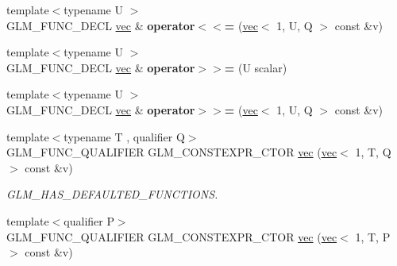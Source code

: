 \begin{DoxyCompactItemize}
{\footnotesize template$<$typename U $>$ }\\G\+L\+M\+\_\+\+F\+U\+N\+C\+\_\+\+D\+E\+CL \hyperlink{structglm_1_1vec}{vec} \& {\bfseries operator$<$$<$=} (\hyperlink{structglm_1_1vec}{vec}$<$ 1, U, Q $>$ const \&v)
\item 
\mbox{\label{structglm_1_1vec_3_011_00_01T_00_01Q_01_4_ad2dbafc1f534fa390f9d50a910c20abb}} 
{\footnotesize template$<$typename U $>$ }\\G\+L\+M\+\_\+\+F\+U\+N\+C\+\_\+\+D\+E\+CL \hyperlink{structglm_1_1vec}{vec} \& {\bfseries operator$>$$>$=} (U scalar)
\item 
\mbox{\label{structglm_1_1vec_3_011_00_01T_00_01Q_01_4_a0b53de5663c96aec88f8ae0ab35ff4cd}} 
{\footnotesize template$<$typename U $>$ }\\G\+L\+M\+\_\+\+F\+U\+N\+C\+\_\+\+D\+E\+CL \hyperlink{structglm_1_1vec}{vec} \& {\bfseries operator$>$$>$=} (\hyperlink{structglm_1_1vec}{vec}$<$ 1, U, Q $>$ const \&v)
\item 
\mbox{\label{structglm_1_1vec_3_011_00_01T_00_01Q_01_4_acf2830b0c38c9707dcda85083f1c93ba}} 
{\footnotesize template$<$typename T , qualifier Q$>$ }\\G\+L\+M\+\_\+\+F\+U\+N\+C\+\_\+\+Q\+U\+A\+L\+I\+F\+I\+ER G\+L\+M\+\_\+\+C\+O\+N\+S\+T\+E\+X\+P\+R\+\_\+\+C\+T\+OR \hyperlink{structglm_1_1vec_3_011_00_01T_00_01Q_01_4_acf2830b0c38c9707dcda85083f1c93ba}{vec} (\hyperlink{structglm_1_1vec}{vec}$<$ 1, T, Q $>$ const \&v)
\begin{DoxyCompactList}\small\item\em G\+L\+M\+\_\+\+H\+A\+S\+\_\+\+D\+E\+F\+A\+U\+L\+T\+E\+D\+\_\+\+F\+U\+N\+C\+T\+I\+O\+NS. \end{DoxyCompactList}\item 
\mbox{\label{structglm_1_1vec_3_011_00_01T_00_01Q_01_4_a65d7b47aa379986d75f0e64f7141f5d0}} 
{\footnotesize template$<$qualifier P$>$ }\\G\+L\+M\+\_\+\+F\+U\+N\+C\+\_\+\+Q\+U\+A\+L\+I\+F\+I\+ER G\+L\+M\+\_\+\+C\+O\+N\+S\+T\+E\+X\+P\+R\+\_\+\+C\+T\+OR \hyperlink{structglm_1_1vec_3_011_00_01T_00_01Q_01_4_a65d7b47aa379986d75f0e64f7141f5d0}{vec} (\hyperlink{structglm_1_1vec}{vec}$<$ 1, T, P $>$ const \&v)

\end{DoxyCompactItemize}
